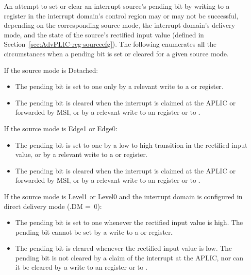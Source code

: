 An attempt to set or clear an interrupt source's pending bit by
writing to a register in the interrupt domain's control region
may or may not be successful, depending on the corresponding
source mode, the interrupt domain's delivery mode, and the
state of the source's rectified input value (defined in
Section~\ref{sec:AdvPLIC-reg-sourcecfg}).
The following enumerates all the circumstances when a pending bit is
set or cleared for a given source mode.

If the source mode is Detached:\nopagebreak
\begin{itemize}

\item
The pending bit is set to one only by a relevant write to a 
or  register.

\item
The pending bit is cleared when the interrupt is claimed at the APLIC or
forwarded by MSI, or by a relevant write to an  register
or to .

\end{itemize}

If the source mode is Edge1 or Edge0:
\begin{itemize}

\item
The pending bit is set to one by a low-to-high transition in the
rectified input value, or by a relevant write to a  or
 register.

\item
The pending bit is cleared when the interrupt is claimed at the APLIC or
forwarded by MSI, or by a relevant write to an  register
or to .

\end{itemize}

If the source mode is Level1 or Level0 and the interrupt domain is
configured in direct delivery mode (.DM =~0):
\begin{itemize}

\item
The pending bit is set to one whenever the rectified input value is
high.
The pending bit cannot be set by a write to a  or 
register.

\item
The pending bit is cleared whenever the rectified input value is low.
The pending bit is not cleared by a claim of the interrupt at the APLIC,
nor can it be cleared by a write to an  register or to
.

\end{itemize}

